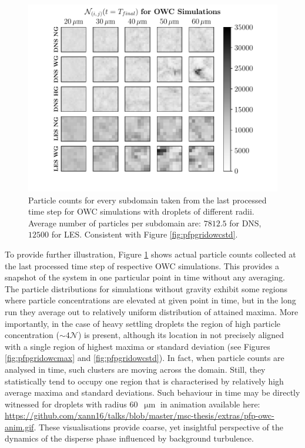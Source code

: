 \documentclass{pracamgren}
\begin{document}
\begin{figure}[!ht]
\centering
\includegraphics[width=13.5cm]{figures/3-20_pfpgridowclast.pdf}
\caption{
Particle counts for every subdomain taken from the last processed time step for OWC simulations with droplets of different radii.
Average number of particles per subdomain are: $7 812.5$ for DNS, $12 500$ for LES.
Consistent with Figure \ref{fig:pfpgridowcstd}.
}
\label{fig:pfpgridowclast}
\end{figure}

To provide further illustration, Figure \ref{fig:pfpgridowclast} shows actual particle counts collected at the last processed time step of respective OWC simulations.
This provides a snapshot of the system in one particular point in time without any averaging.  
The particle distributions for simulations without gravity exhibit some regions where particle concentrations are elevated at given point in time, but in the long run they average out to relatively uniform distribution of attained maxima. 
More importantly, in the case of heavy settling droplets the region of high particle concentration (${\sim 4 \mathcal{N}}$) is present, although its location in not precisely aligned with a single region of highest maxima or standard deviation (see Figures \ref{fig:pfpgridowcmax} and \ref{fig:pfpgridowcstd}).
In fact, when particle counts are analysed in time, such clusters are moving across the domain.
Still, they statistically tend to occupy one region that is characterised by relatively high average maxima and standard deviations.
Such behaviour in time may be directly witnessed for droplets with radius $60$~$\upmu\text{m}$ in animation available here: \url{https://github.com/xann16/talks/blob/master/msc-thesis/extras/pfp-owc-anim.gif}.
These visualisations provide coarse, yet insightful perspective of the dynamics of the disperse phase influenced by background turbulence.
\end{document}
